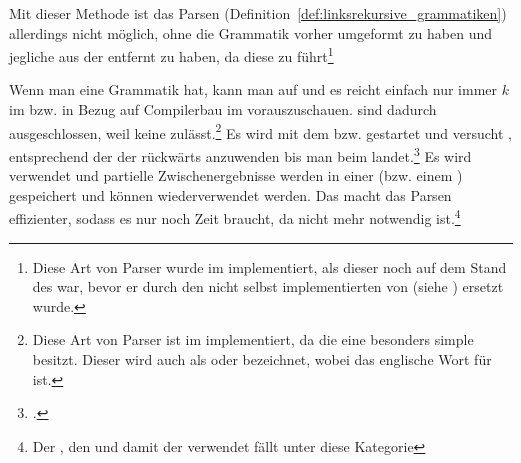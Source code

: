 \begin{Special_Paragraph}
\begin{itemize}[itemsep=-1mm, topsep=-1mm]
  Mit dieser Methode ist das Parsen  (Definition~\ref{def:linksrekursive_grammatiken}) allerdings nicht möglich, ohne die Grammatik vorher umgeformt zu haben und jegliche  aus der  entfernt zu haben, da diese zu  führt\footnote{Diese Art von Parser wurde im  implementiert, als dieser noch auf dem Stand des  war, bevor er durch den nicht selbst implementierten  von  (siehe \cite{noauthor_lark_2022}) ersetzt wurde.}

  Wenn man eine  Grammatik hat, kann man auf  und es reicht einfach nur immer $k$  im  bzw. in Bezug auf Compilerbau  im  vorauszuschauen.  sind dadurch ausgeschlossen, weil  keine  zulässt.\footnote{Diese Art von Parser ist im  implementiert, da die  eine besonders simple  besitzt. Dieser  wird auch als  oder  bezeichnet, wobei  das englische Wort für  ist.}
   Es wird mit dem  bzw.  gestartet und versucht , entsprechend der  der  rückwärts anzuwenden bis man beim  landet.\footcite{noauthor_what_nodate-1}
   Es wird  verwendet und partielle Zwischenergebnisse werden in einer  (bzw. einem ) gespeichert und können wiederverwendet werden. Das macht das Parsen  effizienter, sodass es nur noch  Zeit braucht, da  nicht mehr notwendig ist.\footnote{Der , den  und damit der  verwendet fällt unter diese Kategorie}
\end{itemize}
\end{Special_Paragraph}


